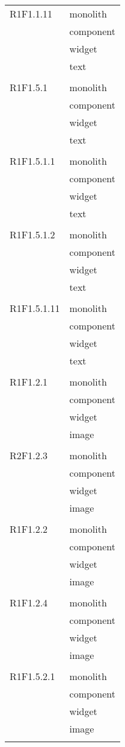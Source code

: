 \begin{center}
\begin{longtable}{|p{7cm}|p{5cm}|}
		R1F1.1.11 & monolith \\ & component \\ & widget \\ & text \\ & \\ \hline
		R1F1.5.1 & monolith \\ & component \\ & widget \\ & text \\ & \\ \hline
		R1F1.5.1.1 & monolith \\ & component \\ & widget \\ & text \\ & \\ \hline
		R1F1.5.1.2 & monolith \\ & component \\ & widget \\ & text \\ & \\ \hline
		R1F1.5.1.11 & monolith \\ & component \\ & widget \\ & text \\ & \\ \hline
		R1F1.2.1 & monolith \\ & component \\ & widget \\ & image \\ & \\ \hline
		R2F1.2.3 & monolith \\ & component \\ & widget \\ & image \\ & \\ \hline
		R1F1.2.2 & monolith \\ & component \\ & widget \\ & image \\ & \\ \hline
		R1F1.2.4 & monolith \\ & component \\ & widget \\ & image \\ & \\ \hline
		R1F1.5.2.1 & monolith \\ & component \\ & widget \\ & image \\ & \\ \hline

\end{longtable}
\end{center}
